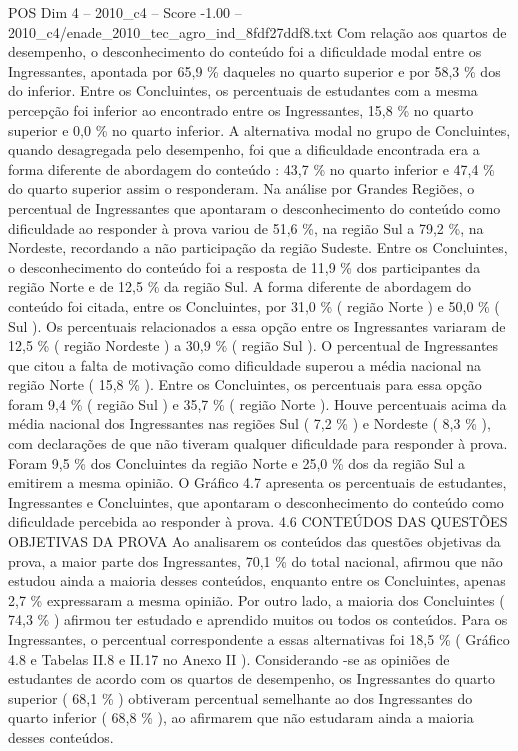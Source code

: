 \begin{textsample}{POS Dim 4 – 2010\_c4 – Score -1.00 – 2010\_c4/enade\_2010\_tec\_agro\_ind\_8fdf27ddf8.txt}
Com relação aos quartos de desempenho, o desconhecimento do conteúdo foi a dificuldade modal entre os Ingressantes, apontada por 65,9 \% daqueles no quarto superior e por 58,3 \% dos do inferior.
Entre os Concluintes, os percentuais de estudantes com a mesma percepção foi inferior ao encontrado entre os Ingressantes, 15,8 \% no quarto superior e 0,0 \% no quarto inferior.
A alternativa modal no grupo de Concluintes, quando desagregada pelo desempenho, foi que a dificuldade encontrada era a forma diferente de abordagem do conteúdo : 43,7 \% no quarto inferior e 47,4 \% do quarto superior assim o responderam.
Na análise por Grandes Regiões, o percentual de Ingressantes que apontaram o desconhecimento do conteúdo como dificuldade ao responder à prova variou de 51,6 \%, na região Sul a 79,2 \%, na Nordeste, recordando a não participação da região Sudeste.
Entre os Concluintes, o desconhecimento do conteúdo foi a resposta de 11,9 \% dos participantes da região Norte e de 12,5 \% da região Sul.
A forma diferente de abordagem do conteúdo foi citada, entre os Concluintes, por 31,0 \% ( região Norte ) e 50,0 \% ( Sul ).
Os percentuais relacionados a essa opção entre os Ingressantes variaram de 12,5 \% ( região Nordeste ) a 30,9 \% ( região Sul ).
O percentual de Ingressantes que citou a falta de motivação como dificuldade superou a média nacional na região Norte ( 15,8 \% ).
Entre os Concluintes, os percentuais para essa opção foram 9,4 \% ( região Sul ) e 35,7 \% ( região Norte ).
Houve percentuais acima da média nacional dos Ingressantes nas regiões Sul ( 7,2 \% ) e Nordeste ( 8,3 \% ), com declarações de que não tiveram qualquer dificuldade para responder à prova.
Foram 9,5 \% dos Concluintes da região Norte e 25,0 \% dos da região Sul a emitirem a mesma opinião.
O Gráfico 4.7 apresenta os percentuais de estudantes, Ingressantes e Concluintes, que apontaram o desconhecimento do conteúdo como dificuldade percebida ao responder à prova. 4.6 CONTEÚDOS DAS QUESTÕES OBJETIVAS DA PROVA Ao analisarem os conteúdos das questões objetivas da prova, a maior parte dos Ingressantes, 70,1 \% do total nacional, afirmou que não estudou ainda a maioria desses conteúdos, enquanto entre os Concluintes, apenas 2,7 \% expressaram a mesma opinião.
Por outro lado, a maioria dos Concluintes ( 74,3 \% ) afirmou ter estudado e aprendido muitos ou todos os conteúdos.
Para os Ingressantes, o percentual correspondente a essas alternativas foi 18,5 \% ( Gráfico 4.8 e Tabelas II.8 e II.17 no Anexo II ).
Considerando -se as opiniões de estudantes de acordo com os quartos de desempenho, os Ingressantes do quarto superior ( 68,1 \% ) obtiveram percentual semelhante ao dos Ingressantes do quarto inferior ( 68,8 \% ), ao afirmarem que não estudaram ainda a maioria desses conteúdos.

\end{textsample}
